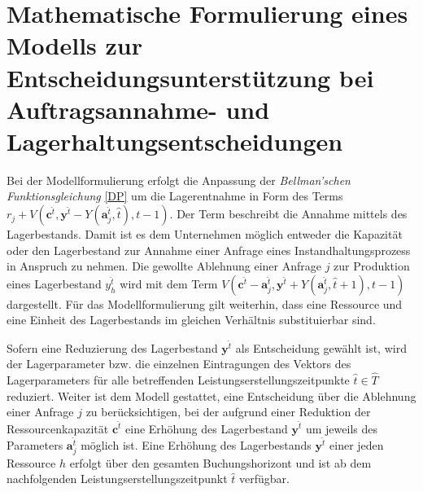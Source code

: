 \section{Mathematische Formulierung eines Modells zur Entscheidungsunterstützung bei Auftragsannahme- und Lagerhaltungsentscheidungen}\label{Umformung}

Bei der Modellformulierung erfolgt die Anpassung der \textit{Bellman'schen Funktionsgleichung}  \eqref{DP} um die Lagerentnahme in Form des Terms $r_{j} + V(\textbf{c}^{\hat t}, \textbf{y}^{\hat t}-Y(\textbf{a}_j^{\hat t}, \hat t), t-1)$. Der Term beschreibt die Annahme mittels des Lagerbestands. Damit ist es dem Unternehmen möglich entweder die Kapazität oder den Lagerbestand zur Annahme einer Anfrage eines Instandhaltungsprozess in Anspruch zu nehmen. Die gewollte Ablehnung einer Anfrage $j$ zur Produktion eines Lagerbestand $y_h^{\hat t}$ wird mit dem Term $V(\textbf{c}^{\hat t}-\textbf{a}^{\hat t}_j, \textbf{y}^{\hat t}+Y(\textbf{a}^{\hat t}_j, \hat t +1), t-1)$ dargestellt. Für das Modellformulierung gilt weiterhin, dass eine Ressource und eine Einheit des Lagerbestands im gleichen Verhältnis substituierbar sind.

Sofern eine Reduzierung des Lagerbestand $\textbf{y}^{\hat t}$ als Entscheidung gewählt ist, wird der Lagerparameter bzw. die einzelnen Eintragungen des Vektors des Lagerparameters für alle betreffenden Leistungserstellungszeitpunkte $\hat t\in \hat T$ reduziert. Weiter ist dem Modell gestattet, eine Entscheidung über die Ablehnung einer Anfrage $j$ zu berücksichtigen, bei der aufgrund einer Reduktion der Ressourcenkapazität $\textbf{c}^{\hat t}$ eine Erhöhung des Lagerbestand $\textbf{y}^{\hat t}$ um jeweils des Parameters $\textbf{a}_j^{\hat t}$ möglich ist. Eine Erhöhung des Lagerbestands $\textbf{y}^{\hat t}$ einer jeden Ressource $h$ erfolgt über den gesamten Buchungshorizont und ist ab dem nachfolgenden Leistungserstellungszeitpunkt $\hat t$ verfügbar. %

